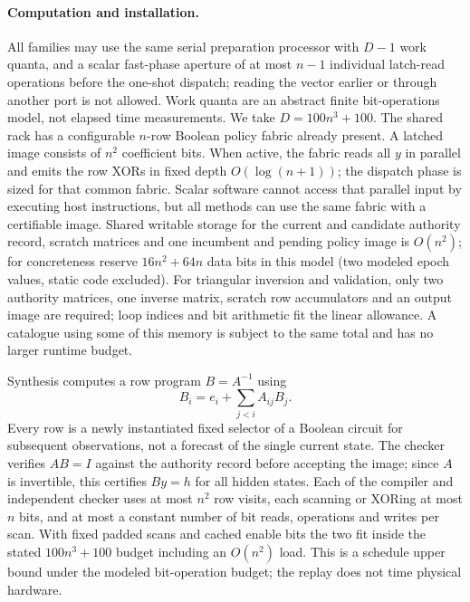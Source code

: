 \documentclass[11pt]{article}
\begin{document}
\paragraph{Computation and installation.}
All families may use the same serial preparation processor with $D-1$ work quanta, and a scalar fast-phase aperture of at most $n-1$ individual latch-read operations before the one-shot dispatch; reading the vector earlier or through another port is not allowed. Work quanta are an abstract finite bit-operations model, not elapsed time measurements. We take $D=100n^3+100$. The shared rack has a configurable $n$-row Boolean policy fabric already present. A latched image consists of $n^2$ coefficient bits. When active, the fabric reads all $y$ in parallel and emits the row XORs in fixed depth $O(\log(n+1))$; the dispatch phase is sized for that common fabric. Scalar software cannot access that parallel input by executing host instructions, but all methods can use the same fabric with a certifiable image. Shared writable storage for the current and candidate authority record, scratch matrices and one incumbent and pending policy image is $O(n^2)$; for concreteness reserve $16n^2+64n$ data bits in this model (two modeled epoch values, static code excluded). For triangular inversion and validation, only two authority matrices, one inverse matrix, scratch row accumulators and an output image are required; loop indices and bit arithmetic fit the linear allowance. A catalogue using some of this memory is subject to the same total and has no larger runtime budget.

Synthesis computes a row program $B=A^{-1}$ using
\[
  B_i=e_i+\sum_{j<i}A_{ij}B_j.
\]
Every row is a newly instantiated fixed selector of a Boolean circuit for subsequent observations, not a forecast of the single current state. The checker verifies $AB=I$ against the authority record before accepting the image; since $A$ is invertible, this certifies $By=h$ for all hidden states. Each of the compiler and independent checker uses at most $n^2$ row visits, each scanning or XORing at most $n$ bits, and at most a constant number of bit reads, operations and writes per scan. With fixed padded scans and cached enable bits the two fit inside the stated $100n^3+100$ budget including an $O(n^2)$ load. This is a schedule upper bound under the modeled bit-operation budget; the replay does not time physical hardware.
\end{document}
